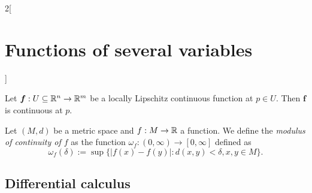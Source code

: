 \documentclass[../../../main.tex]{subfiles}
\begin{document}
\begin{multicols}{2}[\section{Functions of several variables}]
    \begin{prop}
        Let $\mathbf{\boldsymbol{f}}:U\subseteq\mathbb{R}^n\rightarrow\mathbb{R}^m$ be a locally Lipschitz continuous function at $p\in U$. Then $\mathbf{\boldsymbol{f}}$ is continuous at $p$.
    \end{prop}
    \begin{definition}
        Let $(M,d)$ be a metric space and $f:M\rightarrow\mathbb{R} $ a function. We define the \textit{modulus of continuity of $f$} as the function $\omega_f:(0,\infty)\rightarrow[0,\infty]$ defined as $$\omega_f(\delta):=\sup\{|f(x)-f(y)|:d(x,y)<\delta, x,y\in M\}.$$
    \end{definition}
    \subsection{Differential calculus}

\end{multicols}
\end{document}
